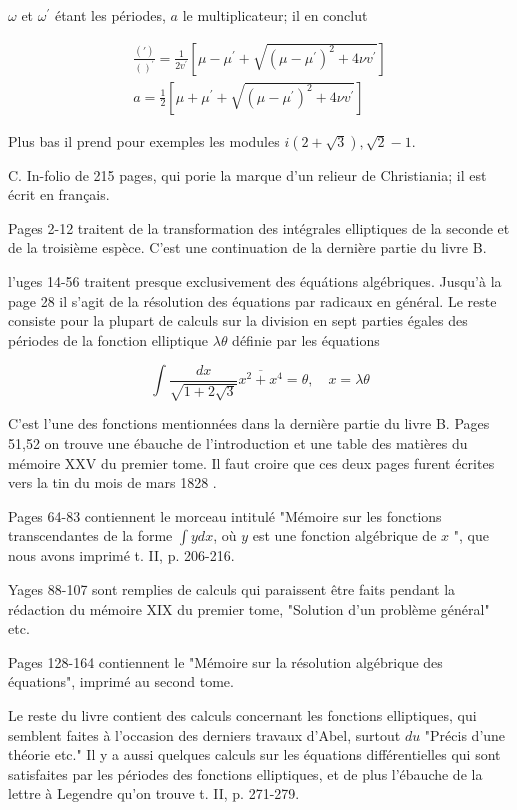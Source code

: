 \documentclass{article}
\begin{document}
\(\omega\) et \(\omega^{\prime}\) étant les périodes, \(a\) le multiplicateur; il en conclut

\[
\begin{gathered}
\frac{(\prime)}{()^{\prime}}=\frac{1}{2 v^{\prime}}\left[\mu-\mu^{\prime}+\sqrt{\left(\mu-\mu^{\prime}\right)^{2}+4 \nu v^{\prime}}\right] \\
a=\frac{1}{2}\left[\mu+\mu^{\prime}+\sqrt{\left(\mu-\mu^{\prime}\right)^{2}+4 \nu v^{\prime}}\right]
\end{gathered}
\]

Plus bas il prend pour exemples les modules \(i(2+\sqrt{3}), \sqrt{2}-1\).

C. In-folio de 215 pages, qui porie la marque d'un relieur de Christiania; il est écrit en français.

Pages 2-12 traitent de la transformation des intégrales elliptiques de la seconde et de la troisième espèce. C'est une continuation de la dernière partie du livre B.

l'uges 14-56 traitent presque exclusivement des équátions algébriques. Jusqu'à la page 28 il s'agit de la résolution des équations par radicaux en général. Le reste consiste pour la plupart de calculs sur la division en sept parties égales des périodes de la fonction elliptique \(\lambda \theta\) définie par les équations

\[
\int \frac{d x}{\sqrt{1+2 \sqrt{3}}} \overline{x^{2}+x^{4}}=\theta, \quad x=\lambda \theta
\]

C'est l'une des fonctions mentionnées dans la dernière partie du livre B. Pages 51,52 on trouve une ébauche de l'introduction et une table des matières du mémoire XXV du premier tome. Il faut croire que ces deux pages furent écrites vers la tin du mois de mars 1828 .

Pages 64-83 contiennent le morceau intitulé "Mémoire sur les fonctions transcendantes de la forme \(\int y d x\), où \(y\) est une fonction algébrique de \(x\) ", que nous avons imprimé t. II, p. 206-216.

Yages 88-107 sont remplies de calculs qui paraissent être faits pendant la rédaction du mémoire XIX du premier tome, "Solution d'un problème général" etc.

Pages 128-164 contiennent le "Mémoire sur la résolution algébrique des équations", imprimé au second tome.

Le reste du livre contient des calculs concernant les fonctions elliptiques, qui semblent faites à l'occasion des derniers travaux d'Abel, surtout \(d u\) "Précis d'une théorie etc." Il y a aussi quelques calculs sur les équations différentielles qui sont satisfaites par les périodes des fonctions elliptiques, et de plus l'ébauche de la lettre à Legendre qu'on trouve t. II, p. 271-279.
\end{document}
